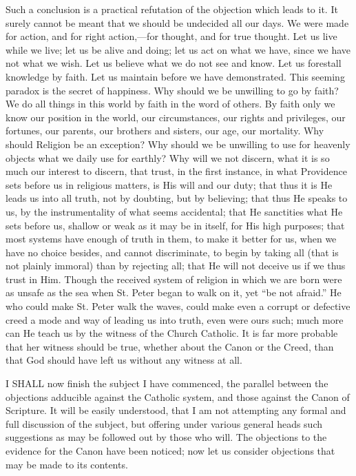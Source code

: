 Such a conclusion is a practical refutation of the objection which
leads to it. It surely cannot be meant that we should be undecided all
our days. We were made for action, and for right action,—for
thought, and for true thought. Let us live while we live; let us be
alive and doing; let us act on what we have, since we have not what we
wish. Let us believe what we do not see and know. Let us forestall
knowledge by faith. Let us maintain before we have demonstrated. This
seeming paradox is the secret of happiness. Why should we be unwilling
to go by faith? We do all things in this world by faith in the word of
others. By faith only we know our position in the world, our
circumstances, our rights and privileges, our fortunes, our parents,
our brothers and sisters, our age, our mortality. Why should Religion
be an exception? Why should we be unwilling to use for heavenly
objects what we daily use for earthly? Why will we not discern, what
it is so much our interest to discern, that trust, in the first
instance, in what Providence sets before us in religious matters, is
His will and our duty; that thus it is He leads us into all truth, not
by doubting, but by believing; that thus He speaks to us, by the
instrumentality of what seems accidental; that He sanctities what He
sets before us, shallow or weak as it may be in itself, for His high
purposes; that most systems have enough of truth in them, to
make it better for us, when we have no choice besides, and cannot
discriminate, to begin by taking all (that is not plainly immoral)
than by rejecting all; that He will not deceive us if we thus trust in
Him. Though the received system of religion in which we are born were
as unsafe as the sea when St. Peter began to walk on it, yet ``be
not afraid.'' He who could make St. Peter walk the waves, could
make even a corrupt or defective creed a mode and way of leading us
into truth, even were ours such; much more can He teach us by the
witness of the Church Catholic. It is far more probable that her
witness should be true, whether about the Canon or the Creed, than
that God should have left us without any witness at all.


I SHALL now finish the subject I have commenced, the parallel
between the objections adducible against the Catholic system, and
those against the Canon of Scripture. It will be easily understood,
that I am not attempting any formal and full discussion of the
subject, but offering under various general heads such suggestions as
may be followed out by those who will. The objections to the evidence
for the Canon have been noticed; now let us consider objections that
may be made to its contents.

